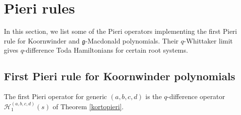 \documentclass[12pt]{amsart}
\newcommand{\g}{{\mathfrak{g}}}
\newcommand{\cH}{{\mathcal{H}}}
\numberwithin{equation}{section}
\begin{document}
\section{Pieri rules}\label{appB}
In this section, we list some of the Pieri operators implementing the first Pieri rule for Koornwinder and $\g$-Macdonald polynomials. Their $q$-Whittaker limit gives $q$-difference Toda Hamiltonians for certain root systems.

\subsection{First Pieri rule for Koornwinder polynomials}
\label{appkorpieri}

The first Pieri operator for generic $(a,b,c,d)$ is the $q$-difference operator $\cH_1^{(a,b,c,d)}(s)$ of Theorem \eqref{kortopieri}. 
\end{document}
